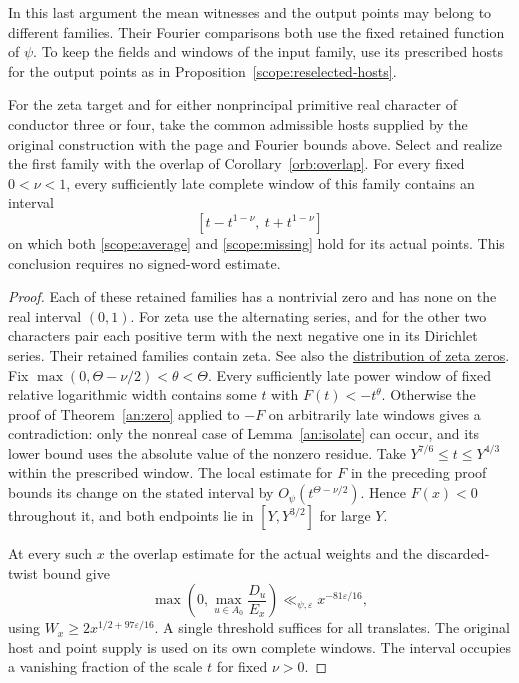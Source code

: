 In this last argument the mean witnesses and the output points
may belong to different families. Their Fourier comparisons both
use the fixed retained function of \(\psi\). To keep the fields and
windows of the input family, use its prescribed hosts for the
output points as in Proposition~\ref{scope:reselected-hosts}.

\begin{corollary}\label{scope:negative-points}
For the zeta target and for either nonprincipal primitive real
character of conductor three or four, take the common admissible
hosts supplied by the original construction with the page and Fourier
bounds above. Select and realize the first family with the overlap
of Corollary~\ref{orb:overlap}. For every fixed \(0<\nu<1\), every
sufficiently late complete window of this family contains an interval
\[
       [t-t^{1-\nu},\ t+t^{1-\nu}]
\]
on which both \eqref{scope:average} and \eqref{scope:missing} hold for
its actual points. This conclusion requires no signed-word estimate.
\end{corollary}
\begin{proof}
Each of these retained families has a nontrivial zero and has none on
the real interval \((0,1)\). For zeta use the alternating series,
and for the other two characters pair each positive term with the
next negative one in its Dirichlet series. Their retained families
contain zeta. See also the
\href{https://dlmf.nist.gov/25.10}{distribution of zeta zeros}.
Fix \(\max(0,\Theta-\nu/2)<\theta<\Theta\). Every sufficiently late
power window of fixed relative logarithmic width contains some \(t\)
with \(F(t)<-t^\theta\). Otherwise the proof of Theorem~\ref{an:zero}
applied to \(-F\) on arbitrarily late windows gives a contradiction:
only the nonreal case of Lemma~\ref{an:isolate} can occur, and its
lower bound uses the absolute value of the nonzero residue.
Take \(Y^{7/6}\le t\le Y^{4/3}\) within the prescribed window.
The local estimate for \(F\) in the preceding proof bounds its
change on the stated interval by \(O_\psi(t^{\Theta-\nu/2})\).
Hence \(F(x)<0\) throughout it, and both endpoints lie in
\([Y,Y^{3/2}]\) for large \(Y\).

At every such \(x\) the overlap estimate for the actual weights and
the discarded-twist bound give
\[
 \max\!\left(0,\max_{u\in A_0}\frac{D_u}{E_x}\right)
       \ll_{\psi,\varepsilon} x^{-81\varepsilon/16},
\]
using \(W_x\ge 2x^{1/2+97\varepsilon/16}\). A single threshold suffices
for all translates. The original host and point supply is used on its
own complete windows. The interval occupies a vanishing fraction of
the scale \(t\) for fixed \(\nu>0\).
\end{proof}
